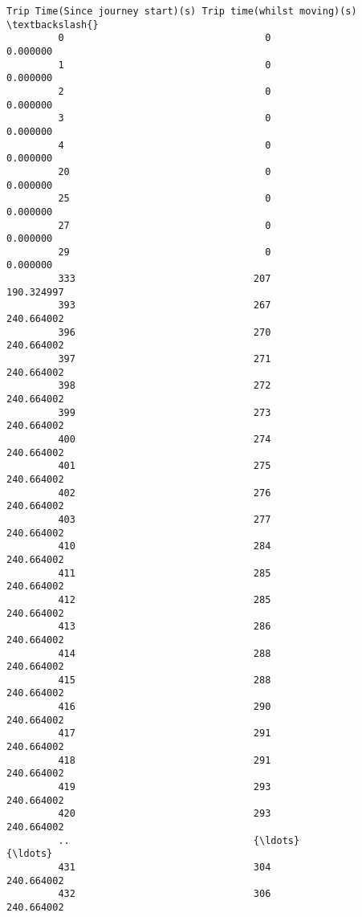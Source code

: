 \documentclass[11pt]{article}
\begin{document}
\begin{Verbatim}[commandchars=\\\{\}]
             Trip Time(Since journey start)(s) Trip time(whilst moving)(s)  \textbackslash{}
         0                                   0                    0.000000   
         1                                   0                    0.000000   
         2                                   0                    0.000000   
         3                                   0                    0.000000   
         4                                   0                    0.000000   
         20                                  0                    0.000000   
         25                                  0                    0.000000   
         27                                  0                    0.000000   
         29                                  0                    0.000000   
         333                               207                  190.324997   
         393                               267                  240.664002   
         396                               270                  240.664002   
         397                               271                  240.664002   
         398                               272                  240.664002   
         399                               273                  240.664002   
         400                               274                  240.664002   
         401                               275                  240.664002   
         402                               276                  240.664002   
         403                               277                  240.664002   
         410                               284                  240.664002   
         411                               285                  240.664002   
         412                               285                  240.664002   
         413                               286                  240.664002   
         414                               288                  240.664002   
         415                               288                  240.664002   
         416                               290                  240.664002   
         417                               291                  240.664002   
         418                               291                  240.664002   
         419                               293                  240.664002   
         420                               293                  240.664002   
         ..                                {\ldots}                         {\ldots}   
         431                               304                  240.664002   
         432                               306                  240.664002   

\end{Verbatim}
\end{document}
